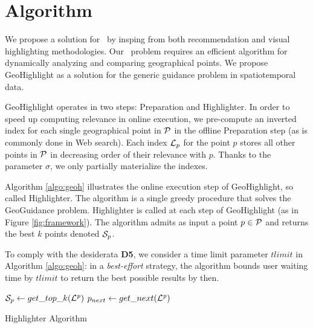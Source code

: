 \section{Algorithm}
\label{sec:algo}
We propose a solution for \pb\ by insping from both recommendation \cite{Omidvar-Tehrani:2015} and
visual highlighting \cite{Lohmann:2012,Robinson2011,Liang2010} methodologies. Our \pb\ problem requires an efficient algorithm for dynamically analyzing and comparing geographical points. We propose {\sc GeoHighlight} as a solution for the generic guidance problem in spatiotemporal data. 

{\sc GeoHighlight} operates in two steps: {\sc Preparation} and {\sc Highlighter}. In order to speed up computing relevance in online execution, we pre-compute an inverted index for each single geographical point in ${\cal P}$ in the offline {\sc Preparation} step (as is commonly done in Web search). Each index ${\cal L}_p$ for the point $p$ stores all other points in ${\cal P}$ in decreasing order of their relevance with $p$. Thanks to the parameter $\sigma$, we only partially materialize the indexes.


Algorithm \ref{algo:geoh} illustrates the online execution step of {\sc GeoHighlight}, so called {\sc Highlighter}. The algorithm is a single greedy procedure that solves the {\sc GeoGuidance} problem. {\sc Highlighter} is called at each step of {\sc GeoHighlight} (as in Figure \ref{fig:framework}). The algorithm admits as input a point $p \in {\cal P}$ and returns the best $k$ points denoted ${\cal S}_p$.

To comply with the desiderata {\bf D5}, we consider a time limit parameter $tlimit$ in Algorithm \ref{algo:geoh}: in a {\em best-effort} strategy, the algorithm bounds user waiting time by $tlimit$ to return the best possible results by then.

\begin{algorithm}[t]
\DontPrintSemicolon
{}
${\cal S}_p \gets get\_top\_k(\mathit{{\cal L}^p})$\;\label{cd:gettopk}
$p_{next} \gets get\_next(\mathit{{\cal L}^p})$\;\label{cd:getnext}
\label{cd:endwhile}
\; 
\caption{{\sc Highlighter} Algorithm}
\label{algo:geoh}
\end{algorithm}

